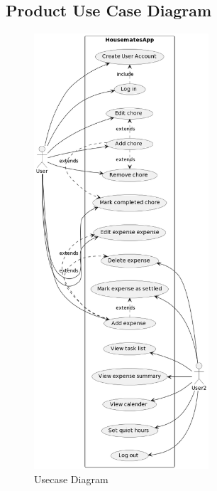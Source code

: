 \documentclass[12pt]{article}
\begin{document}
\subsection{Product Use Case Diagram}
\begin{figure}[H]
    \centering
	\includegraphics[width=6.5cm]{UseCase.png}
	\caption{Usecase Diagram}
 \label{}
\end{figure}
\end{document}
